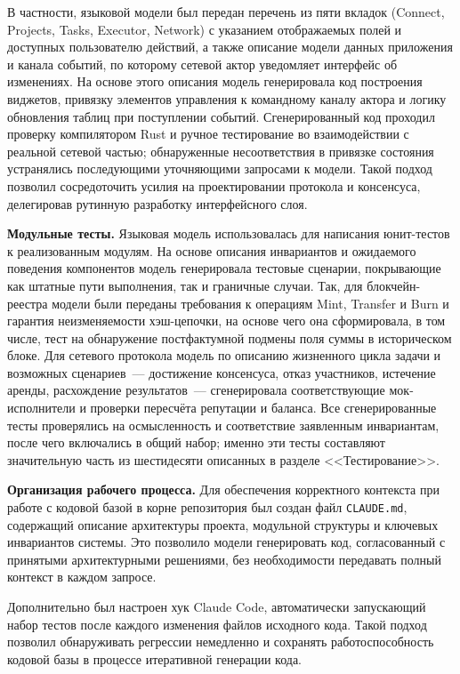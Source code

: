 \documentclass[a4paper,11pt]{extarticle}
\begin{document}
В частности, языковой модели был передан перечень из пяти вкладок (Connect,
Projects, Tasks, Executor, Network) с указанием отображаемых полей и доступных
пользователю действий, а также описание модели данных приложения и канала
событий, по которому сетевой актор уведомляет интерфейс об изменениях. На
основе этого описания модель генерировала код построения виджетов, привязку
элементов управления к командному каналу актора и логику обновления таблиц при
поступлении событий. Сгенерированный код проходил проверку компилятором Rust и
ручное тестирование во взаимодействии с реальной сетевой частью; обнаруженные
несоответствия в привязке состояния устранялись последующими уточняющими
запросами к модели. Такой подход позволил сосредоточить усилия на проектировании
протокола и консенсуса, делегировав рутинную разработку интерфейсного слоя.

\textbf{Модульные тесты.}
Языковая модель использовалась для написания юнит-тестов к реализованным
модулям. На основе описания инвариантов и ожидаемого поведения компонентов
модель генерировала тестовые сценарии, покрывающие как штатные пути выполнения,
так и граничные случаи. Так, для блокчейн-реестра модели были переданы
требования к операциям Mint, Transfer и Burn и гарантия неизменяемости
хэш-цепочки, на основе чего она сформировала, в том числе, тест на обнаружение
постфактумной подмены поля суммы в историческом блоке. Для сетевого протокола
модель по описанию жизненного цикла задачи и возможных сценариев~--- достижение
консенсуса, отказ участников, истечение аренды, расхождение результатов~---
сгенерировала соответствующие мок-исполнители и проверки пересчёта репутации и
баланса. Все сгенерированные тесты проверялись на осмысленность и соответствие
заявленным инвариантам, после чего включались в общий набор; именно эти тесты
составляют значительную часть из шестидесяти описанных в разделе
<<Тестирование>>.

\textbf{Организация рабочего процесса.}
Для обеспечения корректного контекста при работе с кодовой базой в корне
репозитория был создан файл \texttt{CLAUDE.md}, содержащий описание архитектуры
проекта, модульной структуры и ключевых инвариантов системы. Это позволило
модели генерировать код, согласованный с принятыми архитектурными решениями,
без необходимости передавать полный контекст в каждом запросе.

Дополнительно был настроен хук Claude Code, автоматически запускающий набор
тестов после каждого изменения файлов исходного кода. Такой подход позволил
обнаруживать регрессии немедленно и сохранять работоспособность кодовой базы
в процессе итеративной генерации кода.

\newpage
\printbibliography[heading=bibintoc]
\end{document}
